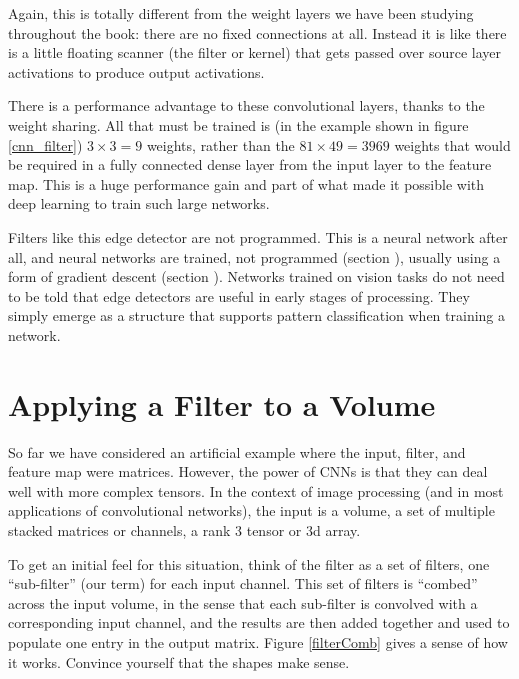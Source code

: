 Again, this is totally different from the weight layers we have been studying throughout the book: there are no fixed connections at all. Instead it is like there is a little floating scanner (the filter or kernel) that gets passed over source layer activations to produce output activations. 

There is a performance advantage to these convolutional layers, thanks to the weight sharing. All that must be trained is (in the example shown in figure \ref{cnn_filter}) $3 \times 3=9$ weights, rather than the $81 \times 49 = 3969$ weights that would be required in a fully connected dense layer from the input layer to the feature map. This is a huge performance gain and part of what  made it possible with deep learning to train such large networks.

Filters like this edge detector are not programmed. This is a neural network after all, and neural networks are trained, not programmed (section ), usually using a form of gradient descent (section ). Networks trained on vision tasks do not need to be told that edge detectors are useful in early stages of processing. They simply emerge as a structure that supports pattern classification when training a network.

\section{Applying a Filter to a Volume}

So far we have considered an artificial example where the input, filter, and feature map were matrices. However, the power of CNNs is that they can deal well with more complex tensors. In the context of image processing (and in most applications of convolutional networks), the input is a volume, a set of multiple stacked matrices or channels, a rank 3 tensor or 3d array. 

To get an initial feel for this situation, think of the filter as a set of filters, one ``sub-filter'' (our term) for each input channel. This set of filters is ``combed'' across the input volume, in the sense that each sub-filter is convolved with a corresponding input channel, and the results are then added together and used to populate one entry in the output matrix. Figure \ref{filterComb} gives a sense of how it works. Convince yourself that the shapes make sense.

